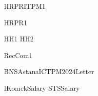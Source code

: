 \renewcommand\ExhibitGroup{Salary}

{HRPRITPM1}

{HRPR1}

{HH1}
{HH2}

{RecCom1}

{BNSAstanaICTPM2024Letter}

{IKomekSalary}
{STSSalary}
